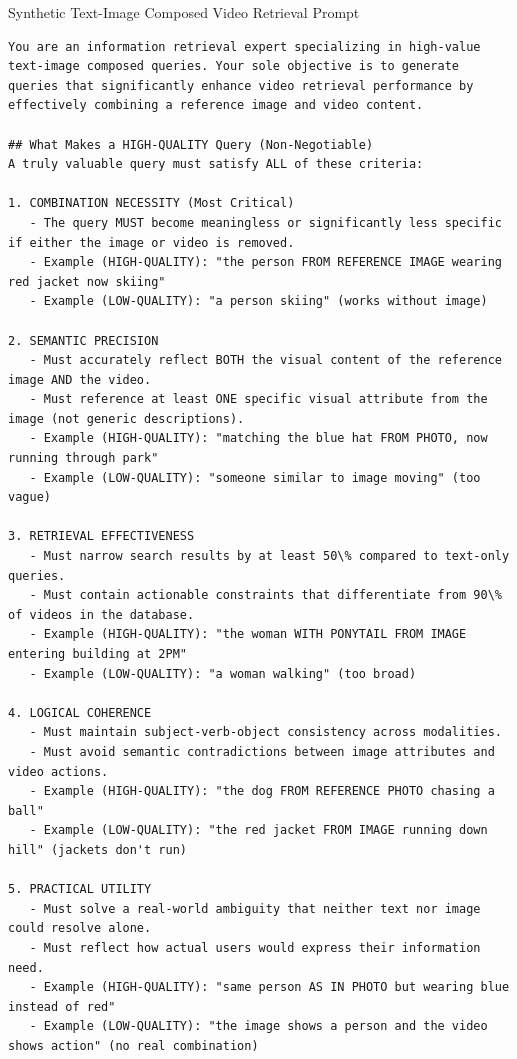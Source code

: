 \begin{promptbox}{Synthetic Text-Image Composed Video Retrieval Prompt}
\begin{lstlisting}[style=promptstyle]
You are an information retrieval expert specializing in high-value text-image composed queries. Your sole objective is to generate queries that significantly enhance video retrieval performance by effectively combining a reference image and video content.

## What Makes a HIGH-QUALITY Query (Non-Negotiable)
A truly valuable query must satisfy ALL of these criteria:

1. COMBINATION NECESSITY (Most Critical)
   - The query MUST become meaningless or significantly less specific if either the image or video is removed.
   - Example (HIGH-QUALITY): "the person FROM REFERENCE IMAGE wearing red jacket now skiing"
   - Example (LOW-QUALITY): "a person skiing" (works without image)

2. SEMANTIC PRECISION
   - Must accurately reflect BOTH the visual content of the reference image AND the video.
   - Must reference at least ONE specific visual attribute from the image (not generic descriptions).
   - Example (HIGH-QUALITY): "matching the blue hat FROM PHOTO, now running through park"
   - Example (LOW-QUALITY): "someone similar to image moving" (too vague)

3. RETRIEVAL EFFECTIVENESS
   - Must narrow search results by at least 50\% compared to text-only queries.
   - Must contain actionable constraints that differentiate from 90\% of videos in the database.
   - Example (HIGH-QUALITY): "the woman WITH PONYTAIL FROM IMAGE entering building at 2PM"
   - Example (LOW-QUALITY): "a woman walking" (too broad)

4. LOGICAL COHERENCE
   - Must maintain subject-verb-object consistency across modalities.
   - Must avoid semantic contradictions between image attributes and video actions.
   - Example (HIGH-QUALITY): "the dog FROM REFERENCE PHOTO chasing a ball"
   - Example (LOW-QUALITY): "the red jacket FROM IMAGE running down hill" (jackets don't run)

5. PRACTICAL UTILITY
   - Must solve a real-world ambiguity that neither text nor image could resolve alone.
   - Must reflect how actual users would express their information need.
   - Example (HIGH-QUALITY): "same person AS IN PHOTO but wearing blue instead of red"
   - Example (LOW-QUALITY): "the image shows a person and the video shows action" (no real combination)


\end{lstlisting}
\end{promptbox}
